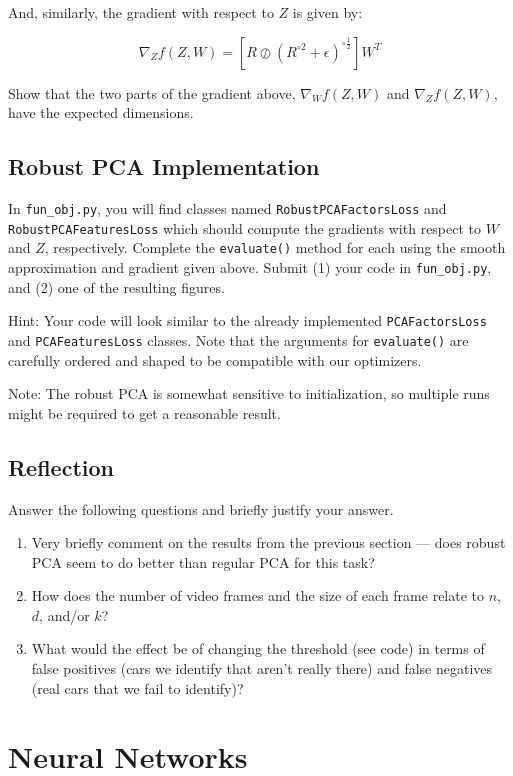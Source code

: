 \documentclass{article}
\newcommand{\blu}[1]{{\textcolor{blu}{#1}}}
\let\ask\blu
\begin{document}
And, similarly, the gradient with respect to $Z$ is given by:

\[
\nabla_Z f(Z,W) = \left[ R \oslash \left(R^{\circ 2} + \epsilon\right)^{\circ \frac12} \right] W^T
\]

\ask{Show that the two parts of the gradient above, $\nabla_W f(Z,W)$ and $\nabla_Z f(Z,W)$, have the expected dimensions.}

\subsection{Robust PCA Implementation}

In \texttt{fun\_obj.py}, you will find classes named \texttt{RobustPCAFactorsLoss} and \texttt{RobustPCAFeaturesLoss} which should compute the gradients with respect to $W$ and $Z$, respectively. \ask{Complete the \texttt{evaluate()} method for each using the smooth approximation and gradient given above. Submit (1) your code in \texttt{fun\_obj.py}, and (2) one of the resulting figures.}

Hint: Your code will look similar to the already implemented \texttt{PCAFactorsLoss} and \texttt{PCAFeaturesLoss} classes. Note that the arguments for \texttt{evaluate()} are carefully ordered and shaped to be compatible with our optimizers.

Note: The robust PCA is somewhat sensitive to initialization, so multiple runs might be required to get a reasonable result.

\subsection{Reflection}
\ask{Answer the following questions and briefly justify your answer.}
\begin{enumerate}
	\item Very briefly comment on the results from the previous section --- does robust PCA seem to do better than regular PCA for this task?
	\item How does the number of video frames and the size of each frame relate to $n$, $d$, and/or $k$?
	\item What would the effect be of changing the threshold (see code) in terms of false positives (cars we identify that aren't really there) and false negatives (real cars that we fail to identify)?
\end{enumerate}

\section{Neural Networks}
\end{document}
